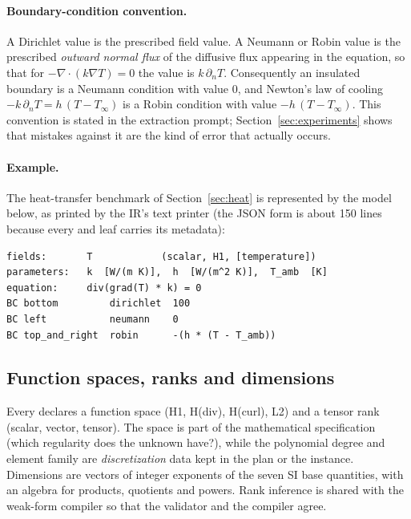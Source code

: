 \paragraph{Boundary-condition convention.}
A Dirichlet value is the prescribed field value. A Neumann or Robin value is the prescribed \emph{outward normal flux} of the diffusive flux appearing in the equation, so that for $-\nabla\cdot(k\nabla T)=0$ the value is $k\,\partial_n T$. Consequently an insulated boundary is a Neumann condition with value $0$, and Newton's law of cooling $-k\,\partial_n T=h\,(T-T_\infty)$ is a Robin condition with value $-h\,(T-T_\infty)$. This convention is stated in the extraction prompt; Section~\ref{sec:experiments} shows that mistakes against it are the kind of error that actually occurs.

\paragraph{Example.}
The heat-transfer benchmark of Section~\ref{sec:heat} is represented by the model below, as printed by the IR's text printer (the JSON form is about 150 lines because every  and  leaf carries its metadata):
\begin{lstlisting}
fields:       T            (scalar, H1, [temperature])
parameters:   k  [W/(m K)],  h  [W/(m^2 K)],  T_amb  [K]
equation:     div(grad(T) * k) = 0
BC bottom         dirichlet  100
BC left           neumann    0
BC top_and_right  robin      -(h * (T - T_amb))
\end{lstlisting}

\subsection{Function spaces, ranks and dimensions}
Every  declares a function space (H1, H(div), H(curl), L2) and a tensor rank (scalar, vector, tensor). The space is part of the mathematical specification (which regularity does the unknown have?), while the polynomial degree and element family are \emph{discretization} data kept in the plan or the instance. Dimensions are vectors of integer exponents of the seven SI base quantities, with an algebra for products, quotients and powers. Rank inference is shared with the weak-form compiler so that the validator and the compiler agree.

